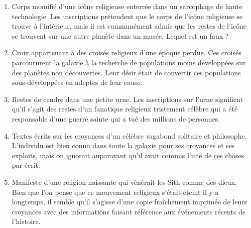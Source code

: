 \documentclass{article}
\begin{document}
\begin{enumerate}
	\item Corps momifié d'une icône religieuse enterrée dans un sarcophage de haute technologie. Les inscriptions prétendent que le corps de l'icône religieuse se trouve à l'intérieur, mais il est communément admis que les restes de l'icône se trouvent sur une autre planète dans un musée. Lequel est un faux ?
	\item Croix appartenant à des croisés religieux d'une époque perdue. Ces croisés parcoururent la galaxie à la recherche de populations moins développées sur des planètes non découvertes. Leur désir était de convertir ces populations sous-développées en adeptes de leur cause.
	\item Restes de cendre dans une petite urne. Les inscriptions sur l'urne signifient qu'il s'agit des restes d'un fanatique religieux tristement célèbre qui a été responsable d'une guerre sainte qui a tué des millions de personnes.
	\item Textes écrits sur les croyances d'un célèbre vagabond solitaire et philosophe. L'individu est bien connu dans toute la galaxie pour ses croyances et ses exploits, mais on ignorait auparavant qu'il avait commis l'une de ces choses par écrit.
	\item Manifeste d'une religion naissante qui vénérait les Sith comme des dieux. Bien que l'on pense que ce mouvement religieux s'était éteint il y a longtemps, il semble qu'il s'agisse d'une copie fraîchement imprimée de leurs croyances avec des informations faisant référence aux événements récents de l'histoire.
\end{enumerate}
\end{document}
